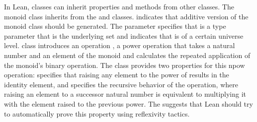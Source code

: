 In Lean, classes can inherit properties and methods from other classes. The
monoid class inherits from the  and
 classes. 
indicates that additive version of the monoid class should be generated. The
parameter  specifies that  is a type
parameter that is the underlying set and  indicates
that  is of a certain universe level.  class
introduces an operation , a power operation that takes a
natural number and an element of the monoid and calculates the repeated
application of the monoid's binary operation. The class provides two properties
for this npow operation:  specifies that raising
any element to the power of  results in the identity element, and
 specifies the recursive behavior of the
 operation, where raising an element to a successor
natural number is equivalent to multiplying it with the element raised to the
previous power. The  suggests that Lean should
try to automatically prove this property using reflexivity tactics.

